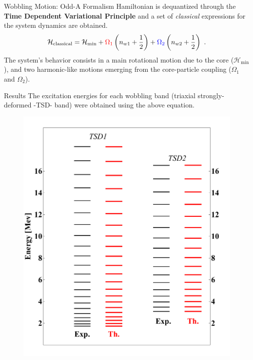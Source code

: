 \documentclass[final]{beamer}
\newlength{\colwidth}
\begin{document}
\begin{frame}[t]
\begin{columns}[t]
\begin{column}{\colwidth}
\begin{block}{Wobbling Motion: Odd-A Formalism}
Hamiltonian is dequantized through the \textbf{Time Dependent Variational Principle} and a set of \emph{classical} expressions for the system dynamics are obtained.
\begin{align}
    \mathcal{H}_\text{classical}=\mathcal{H}_\text{min}+{\color{red}\Omega_1}\left(n_{w1}+\frac{1}{2}\right)+{\color{blue}\Omega_2}\left(n_{w2}+\frac{1}{2}\right)\ .
\end{align}
The system's behavior consists in a main rotational motion due to the core ($\mathcal{H}_\text{min}$), and two harmonic-like motions emerging from the core-particle coupling ($\Omega_1$ and $\Omega_2$).
  \end{block}
    \begin{block}{Results}
    The excitation energies for each wobbling band (triaxial strongly-deformed -TSD- band) were obtained using the above equation.
  \begin{figure}
\centering
\begin{minipage}{.5\textwidth}
  \centering
  \includegraphics[scale=0.9]{images/TSD-12.pdf}
\end{minipage}%
\begin{minipage}{.5\textwidth}

\end{minipage}
\end{figure}
\end{block}
\end{column}
\end{columns}
\end{frame}
\end{document}
